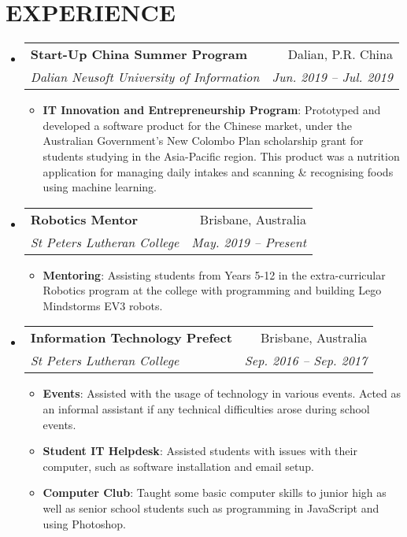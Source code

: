 \documentclass[a4paper, 10pt]{article}
\makeatletter
\newcommand{\resumeItem}[2]{
  \item\small{
    \textbf{#1}{: #2 \vspace{-2pt}}
  }
}
\newcommand{\resumeSubheading}[4]{
  \vspace{-1pt}\item
    \begin{tabular*}{0.97\textwidth}{l@{\extracolsep{\fill}}r}
      \textbf{#1} & #2 \\
      \textit{\small#3} & \textit{\small #4} \\
    \end{tabular*}\vspace{-5pt}
}
\newcommand{\resumeSubHeadingListStart}{\begin{itemize}[leftmargin=*]}
\newcommand{\resumeSubHeadingListEnd}{\end{itemize}}
\newcommand{\resumeItemListStart}{\begin{itemize}}
\newcommand{\resumeItemListEnd}{\end{itemize}\vspace{-5pt}}
\makeatother
\begin{document}
\section{EXPERIENCE}
  \resumeSubHeadingListStart
  
    \resumeSubheading
    {Start-Up China Summer Program}{Dalian, P.R. China}{Dalian Neusoft University of Information}{Jun. 2019 -- Jul. 2019}
    \resumeItemListStart
      \resumeItem{IT Innovation and Entrepreneurship Program}{Prototyped and developed a software product for the Chinese market, under the Australian Government's New Colombo Plan scholarship grant for students studying in the Asia-Pacific region. This product was a nutrition application for managing daily intakes and scanning \& recognising foods using machine learning.}
      \resumeItemListEnd


  	\resumeSubheading
  	{Robotics Mentor}{Brisbane, Australia}{St Peters Lutheran College}{May. 2019 -- Present}
  	\resumeItemListStart
  		\resumeItem{Mentoring}{Assisting students from Years 5-12 in the extra-curricular Robotics program at the college with programming and building Lego Mindstorms EV3 robots.}
  		\resumeItemListEnd

    \resumeSubheading
      {Information Technology Prefect}{Brisbane, Australia}
      {St Peters Lutheran College}{Sep. 2016 -- Sep. 2017}
      \resumeItemListStart
        \resumeItem{Events}
          {Assisted with the usage of technology in various events. Acted as an informal assistant if any technical difficulties arose during school events.}
        \resumeItem{Student IT Helpdesk}
          {Assisted students with issues with their computer, such as software installation and email setup.}
        \resumeItem{Computer Club}
          {Taught some basic computer skills to junior high as well as senior school students such as programming in JavaScript and using Photoshop.}
      \resumeItemListEnd

  \resumeSubHeadingListEnd


\end{document}
